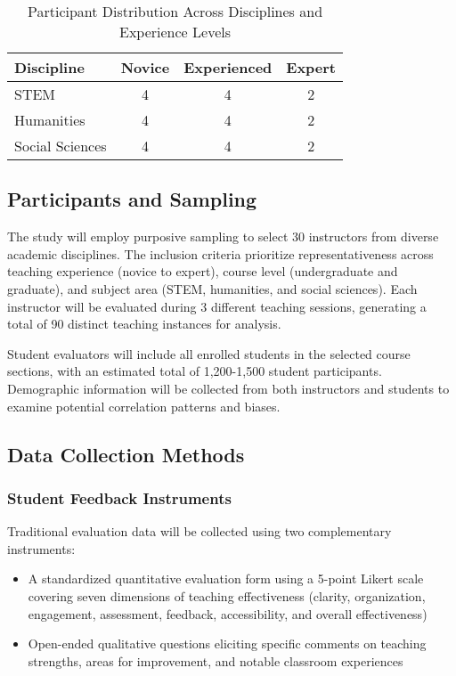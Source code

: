 \begin{table}[H]
    \normalsize
    \centering
    \caption{ Participant Distribution Across Disciplines and Experience Levels}
    \label{tab:participants}
    \begin{tabular}{lccc}
        \toprule
        \textbf{Discipline} & \textbf{Novice} & \textbf{Experienced} & \textbf{Expert} \\
        \midrule
        STEM & 4 & 4 & 2 \\
        Humanities & 4 & 4 & 2 \\
        Social Sciences & 4 & 4 & 2 \\
        \bottomrule
    \end{tabular}
\end{table}

\subsection{Participants and Sampling}
The study will employ purposive sampling to select 30 instructors from diverse academic disciplines. The inclusion criteria prioritize representativeness across teaching experience (novice to expert), course level (undergraduate and graduate), and subject area (STEM, humanities, and social sciences). Each instructor will be evaluated during 3 different teaching sessions, generating a total of 90 distinct teaching instances for analysis.


Student evaluators will include all enrolled students in the selected course sections, with an estimated total of 1,200-1,500 student participants. Demographic information will be collected from both instructors and students to examine potential correlation patterns and biases.

\subsection{Data Collection Methods}

\subsubsection{Student Feedback Instruments}
Traditional evaluation data will be collected using two complementary instruments:

\begin{itemize}
    \item A standardized quantitative evaluation form using a 5-point Likert scale covering seven dimensions of teaching effectiveness (clarity, organization, engagement, assessment, feedback, accessibility, and overall effectiveness)
    \item Open-ended qualitative questions eliciting specific comments on teaching strengths, areas for improvement, and notable classroom experiences
\end{itemize}


